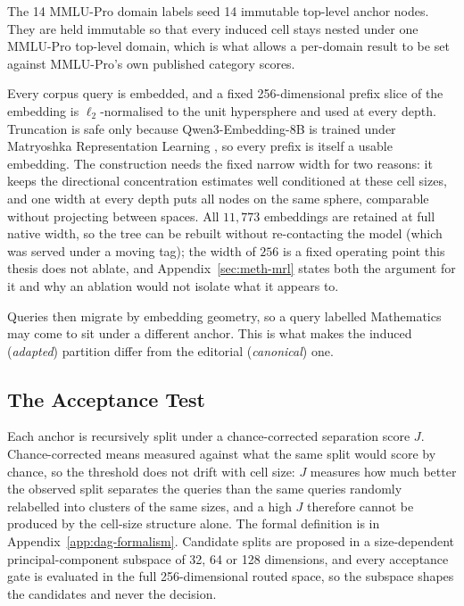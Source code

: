 The 14 MMLU-Pro domain labels seed 14 immutable top-level anchor nodes.
They are held immutable so that every induced cell stays nested under
one MMLU-Pro top-level domain, which is what allows a per-domain result
to be set against MMLU-Pro's own published category scores.

Every corpus query is embedded, and a fixed 256-dimensional prefix
slice of the embedding is $\ell_2$-normalised to the unit hypersphere
and used at every depth. Truncation is safe only because
Qwen3-Embedding-8B is trained under Matryoshka Representation
Learning \parencite{kusupati2022mrl}, so every prefix is itself a
usable embedding. The construction needs the fixed narrow width for
two reasons: it keeps the directional concentration estimates well
conditioned at these cell sizes, and one width at every depth puts
all nodes on the same sphere, comparable without projecting between
spaces. All $11{,}773$ embeddings are retained at full native width,
so the tree can be rebuilt without re-contacting the model (which was
served under a moving tag); the width of $256$ is a fixed operating
point this thesis does not ablate, and
Appendix~\ref{sec:meth-mrl} states both the argument for it and why
an ablation would not isolate what it appears to.

Queries then migrate by embedding geometry, so a query labelled
Mathematics may come to sit under a different anchor. This is what
makes the induced (\textit{adapted}) partition differ from the
editorial (\textit{canonical}) one.

\subsection{The Acceptance Test}\label{sec:arch-acceptance}

Each anchor is recursively split under a chance-corrected separation
score $J$. Chance-corrected means measured against what the same split
would score by chance, so the threshold does not drift with cell size:
$J$ measures how much better the observed split separates the queries
than the same queries randomly relabelled into clusters of the same
sizes, and a high $J$ therefore cannot be produced by the cell-size
structure alone. The formal definition is in
Appendix~\ref{app:dag-formalism}. Candidate splits are proposed in a
size-dependent principal-component subspace of 32, 64 or 128
dimensions, and every acceptance gate is evaluated in the full
256-dimensional routed space, so the subspace shapes the candidates and
never the decision.

